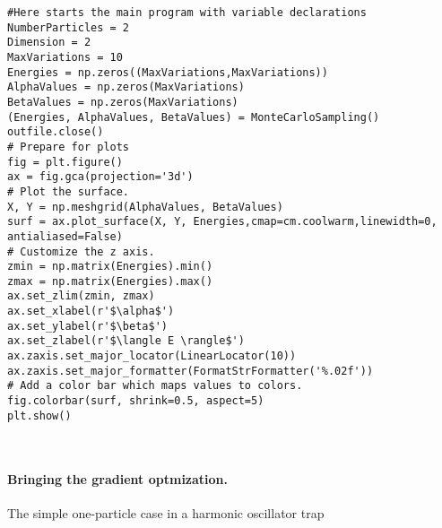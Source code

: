 \documentclass[%
oneside,                 %
final,                   %
10pt]{article}
\begin{document}
\begin{verbatim}
#Here starts the main program with variable declarations
NumberParticles = 2
Dimension = 2
MaxVariations = 10
Energies = np.zeros((MaxVariations,MaxVariations))
AlphaValues = np.zeros(MaxVariations)
BetaValues = np.zeros(MaxVariations)
(Energies, AlphaValues, BetaValues) = MonteCarloSampling()
outfile.close()
# Prepare for plots
fig = plt.figure()
ax = fig.gca(projection='3d')
# Plot the surface.
X, Y = np.meshgrid(AlphaValues, BetaValues)
surf = ax.plot_surface(X, Y, Energies,cmap=cm.coolwarm,linewidth=0, antialiased=False)
# Customize the z axis.
zmin = np.matrix(Energies).min()
zmax = np.matrix(Energies).max()
ax.set_zlim(zmin, zmax)
ax.set_xlabel(r'$\alpha$')
ax.set_ylabel(r'$\beta$')
ax.set_zlabel(r'$\langle E \rangle$')
ax.zaxis.set_major_locator(LinearLocator(10))
ax.zaxis.set_major_formatter(FormatStrFormatter('%.02f'))
# Add a color bar which maps values to colors.
fig.colorbar(surf, shrink=0.5, aspect=5)
plt.show()



\end{verbatim}


\paragraph{Bringing the gradient optmization.}
The simple one-particle case in a harmonic oscillator trap
\end{document}
